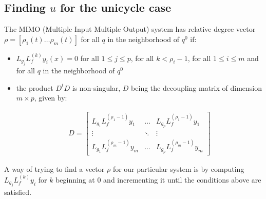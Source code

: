 \documentclass[letterpaper, 10 pt, conference]{ieeeconf}  %
\begin{document}

\subsection{Finding $u$ for the unicycle case}

The MIMO (Multiple Input Multiple Output) system has relative degree vector $\rho = [\rho_1(t) \dots \rho_m(t)]$ for all $q$ in the neighborhood of $q^0$ if:

\begin{itemize}
\item $L_{g_j}L_f^{(k)}y_i(x) = 0$ for all $1 \leq j \leq p$, for all $k < \rho_i-1$, for all $1 \leq i \leq m$ and for all $q$ in the neighborhood of $q^0$
\item the product $D^tD$ is non-singular, $D$ being the decoupling matrix of dimension $m \times p$, given by:

\begin{eqnarray}
D = 
\left[\begin{array}{ccc}
L_{g_1}L_f^{(\rho_1-1)}y_1 & \dots & L_{g_p}L_f^{(\rho_1-1)}y_1\\
\vdots & \ddots & \vdots\\
L_{g_1}L_f^{(\rho_m-1)}y_m & \dots & L_{g_p}L_f^{(\rho_m-1)}y_m
\end{array}\right]
\end{eqnarray}
\end{itemize}

A way of trying to find a vector $\rho$ for our particular system is by computing $L_{g_j}L_f^{(k)}y_i$ for $k$ beginning at $0$ and incrementing it until the conditions above are satisfied.
\end{document}
